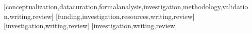 \documentclass[spanish]{textolivre}
\begin{document}
\printbibliography\label{sec-bib}


\begin{contributors}
[conceptualization,datacuration,formalanalysis,investigation,methodology,validation,writing,review]
[funding,investigation,resources,writing,review]
[investigation,writing,review]
[investigation,writing,review]
\end{contributors}
\end{document}
